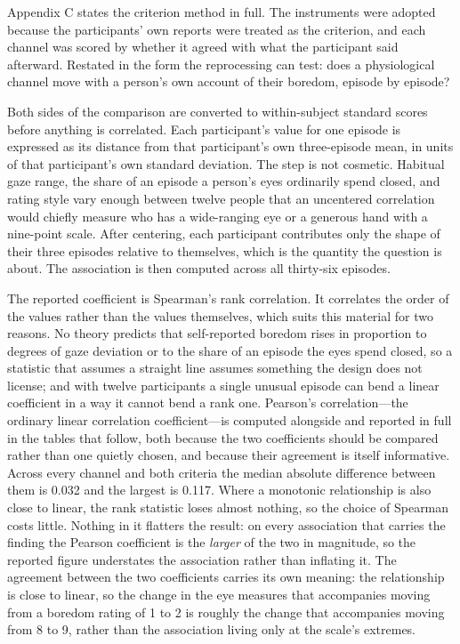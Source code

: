 Appendix C states the criterion method in full. The instruments were adopted because the
participants' own reports were treated as the criterion, and each channel was scored by
whether it agreed with what the participant said afterward. Restated in the form the
reprocessing can test: does a physiological channel move with a person's own account of their
boredom, episode by episode?

Both sides of the comparison are converted to within-subject standard scores before anything
is correlated. Each participant's value for one episode is expressed as its distance from
that participant's own three-episode mean, in units of that participant's own standard
deviation. The step is not cosmetic. Habitual gaze range, the share of an episode a person's
eyes ordinarily spend closed, and rating style vary enough between twelve people that an
uncentered correlation would chiefly measure who has a wide-ranging eye or a generous hand
with a nine-point scale. After centering, each participant contributes only the shape of
their three episodes relative to themselves, which is the quantity the question is about. The
association is then computed across all thirty-six episodes.

The reported coefficient is Spearman's rank correlation. It correlates the order of the values
rather than the values themselves, which suits this material for two reasons. No theory
predicts that self-reported boredom rises in proportion to degrees of gaze deviation or to
the share of an episode the eyes spend closed, so a statistic that assumes a straight line
assumes something the design does not license; and with twelve participants a single unusual
episode can bend a linear coefficient in a way it cannot bend a rank one. Pearson's
correlation---the ordinary linear correlation coefficient---is computed alongside and
reported in full in the tables that follow, both because the two coefficients should be
compared rather than one quietly chosen, and because their agreement is itself informative.
Across every channel and both criteria the median absolute difference between them is 0.032
and the largest is 0.117. Where a monotonic relationship is also close to linear, the rank
statistic loses almost nothing, so the choice of Spearman costs little. Nothing in it
flatters the result: on every association that carries the finding the Pearson coefficient is
the \textit{larger} of the two in magnitude, so the reported figure understates the
association rather than inflating it. The agreement between the two coefficients carries its
own meaning: the relationship is close to linear, so the change in the eye measures that
accompanies moving from a boredom rating of 1 to 2 is roughly the change that accompanies
moving from 8 to 9, rather than the association living only at the scale's extremes.

